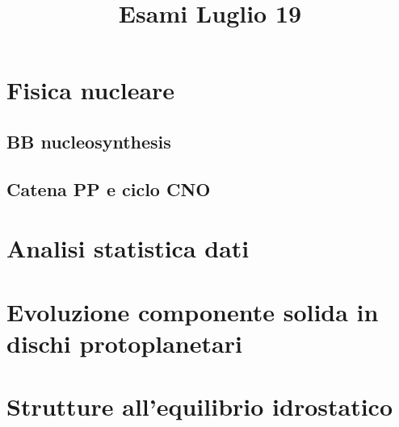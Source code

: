 \documentclass[oneside,20pt,fleqn,extrafontsizes]{memoir}
\title{Esami Luglio 19}
\begin{document}
\pagestyle{mystyle}%
\renewcommand*{\contentsname}{\hypertarget{toc}{Table of Contents}}%
\maketitle
\part{Fisica nucleare}
\chapter{BB nucleosynthesis}
\chapter{Catena PP e ciclo CNO}

\part{Analisi statistica dati}

\part{Evoluzione componente solida in dischi protoplanetari}

\part{Strutture all'equilibrio idrostatico}

\end{document}
